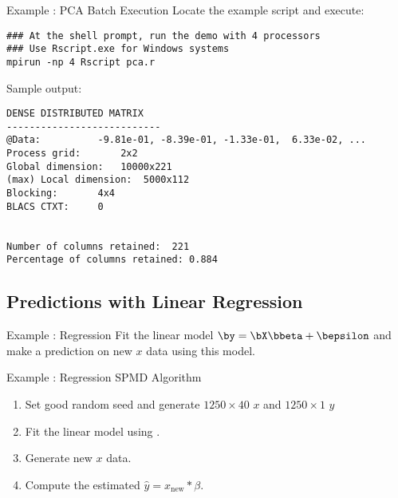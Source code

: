 \begin{frame}
  \begin{exampleblock}{Example \showex :  PCA Batch Execution}\pause
  Locate the  example script  and execute:
\vspace{-.4cm}
  \begin{lstlisting}[language=Sh]
### At the shell prompt, run the demo with 4 processors
### Use Rscript.exe for Windows systems
mpirun -np 4 Rscript pca.r
\end{lstlisting}
Sample output:\vspace{-.4cm}
\begin{lstlisting}[language=Sh]
DENSE DISTRIBUTED MATRIX
---------------------------
@Data:			-9.81e-01, -8.39e-01, -1.33e-01,  6.33e-02, ...
Process grid:		2x2
Global dimension:	10000x221
(max) Local dimension:	5000x112
Blocking:		4x4
BLACS CTXT:		0


Number of columns retained:	 221 
Percentage of columns retained: 0.884 
\end{lstlisting}
  \end{exampleblock}
\end{frame}





\subsection{Predictions with Linear Regression}

\begin{frame}
  \begin{block}{Example \countex :  Regression}\pause
    Fit the linear model $\by = \bX \bbeta + \bepsilon$ and make a prediction on new $x$ data using this model.
  \end{block}
\end{frame}

\begin{frame}[fragile]
  \begin{block}{Example \showex :  Regression SPMD Algorithm}\pause
    \begin{enumerate}
     \item Set good random seed and generate $1250\times 40$  $x$ and $1250\times 1$  $y$
     \item Fit the linear model using .
     \item Generate new $x$ data.
     \item Compute the estimated $\hat{y} = x_{\text{new}}*\beta$.
    \end{enumerate}
  \end{block}
\end{frame}


